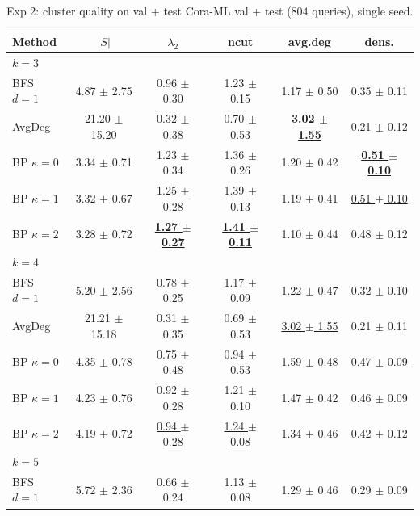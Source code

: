 \documentclass{beamer}
\begin{document}
\begin{frame}{Exp 2: cluster quality on val + test}
  Cora-ML val + test ($804$ queries), single seed.

  \vfill

  \tiny
  \begin{center}
  \begin{tabular}{lccccc}
    \toprule
    Method & $|S|$ & $\lambda_2$ & ncut & avg.deg & dens. \\
    \midrule
    \multicolumn{6}{l}{\textit{$k = 3$}} \\
    BFS $d{=}1$              & 4.87 $\pm$ 2.75   & 0.96 $\pm$ 0.30 & 1.23 $\pm$ 0.15 & 1.17 $\pm$ 0.50 & 0.35 $\pm$ 0.11 \\
    AvgDeg                   & 21.20 $\pm$ 15.20 & 0.32 $\pm$ 0.38 & 0.70 $\pm$ 0.53 & \underline{\textbf{3.02 $\pm$ 1.55}} & 0.21 $\pm$ 0.12 \\
    BP $\kappa{=}0$          & 3.34 $\pm$ 0.71   & 1.23 $\pm$ 0.34 & 1.36 $\pm$ 0.26 & 1.20 $\pm$ 0.42 & \underline{\textbf{0.51 $\pm$ 0.10}} \\
    BP $\kappa{=}1$          & 3.32 $\pm$ 0.67   & 1.25 $\pm$ 0.28 & 1.39 $\pm$ 0.13 & 1.19 $\pm$ 0.41 & \underline{0.51 $\pm$ 0.10} \\
    BP $\kappa{=}2$          & 3.28 $\pm$ 0.72   & \underline{\textbf{1.27 $\pm$ 0.27}} & \underline{\textbf{1.41 $\pm$ 0.11}} & 1.10 $\pm$ 0.44 & 0.48 $\pm$ 0.12 \\
    \midrule
    \multicolumn{6}{l}{\textit{$k = 4$}} \\
    BFS $d{=}1$              & 5.20 $\pm$ 2.56   & 0.78 $\pm$ 0.25 & 1.17 $\pm$ 0.09 & 1.22 $\pm$ 0.47 & 0.32 $\pm$ 0.10 \\
    AvgDeg                   & 21.21 $\pm$ 15.18 & 0.31 $\pm$ 0.35 & 0.69 $\pm$ 0.53 & \underline{3.02 $\pm$ 1.55} & 0.21 $\pm$ 0.11 \\
    BP $\kappa{=}0$          & 4.35 $\pm$ 0.78   & 0.75 $\pm$ 0.48 & 0.94 $\pm$ 0.53 & 1.59 $\pm$ 0.48 & \underline{0.47 $\pm$ 0.09} \\
    BP $\kappa{=}1$          & 4.23 $\pm$ 0.76   & 0.92 $\pm$ 0.28 & 1.21 $\pm$ 0.10 & 1.47 $\pm$ 0.42 & 0.46 $\pm$ 0.09 \\
    BP $\kappa{=}2$          & 4.19 $\pm$ 0.72   & \underline{0.94 $\pm$ 0.28} & \underline{1.24 $\pm$ 0.08} & 1.34 $\pm$ 0.46 & 0.42 $\pm$ 0.12 \\
    \midrule
    \multicolumn{6}{l}{\textit{$k = 5$}} \\
    BFS $d{=}1$              & 5.72 $\pm$ 2.36   & 0.66 $\pm$ 0.24 & 1.13 $\pm$ 0.08 & 1.29 $\pm$ 0.46 & 0.29 $\pm$ 0.09 \\

\end{tabular}
\end{center}
\end{frame}
\end{document}
